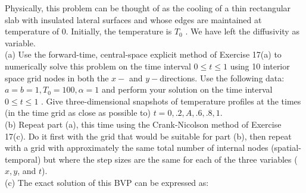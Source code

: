 \documentclass[../main.tex]{subfiles}
\begin{document}
\begin{enumerate}
Physically, this problem can be thought of as the cooling of a thin rectangular slab with insulated lateral surfaces and whose edges are maintained at temperature of 0. Initially, the temperature is $T_0$ . We have left the diffusivity as variable.
\\  
(a) Use the forward-time, central-space explicit method of Exercise 17(a) to numerically solve this problem on the time interval $0 \leqslant t \leqslant 1$ using 10 interior space grid nodes in both the $x-$ and $y-$directions. Use the following data: $a = b = 1, T_0 = 100, \alpha = 1$ and perform your solution on the time interval $0 \leqslant t \leqslant 1$ . Give three-dimensional snapshots of temperature profiles at the times (in the time grid as close as possible to) $t = 0, .2, A, .6, .8, 1$.
\\
(b) Repeat part (a), this time using the Crank-Nicolson method of Exercise 17(c). Do it first with the grid that would be suitable for part (b), then repeat with a grid with approximately the same total number of internal nodes (spatial-temporal) but where the step sizes are the same for each of the three variables ($x, y$, and $t$).
\\
(c) The exact solution of this BVP can be expressed as:


\end{enumerate}
\end{document}
